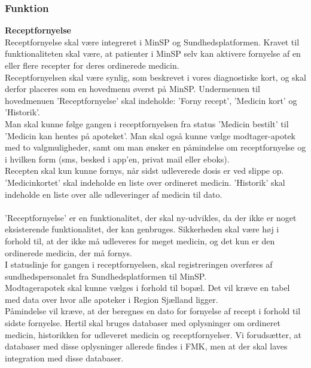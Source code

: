 \subsubsection{Funktion}
\textbf{Receptfornyelse}\\
Receptfornyelse skal være integreret i MinSP og Sundhedsplatformen. 
Kravet til funktionaliteten skal være, at patienter i MinSP selv kan aktivere fornyelse af en eller flere recepter for deres ordinerede medicin. 
\\
Receptfornyelsen skal være synlig, som beskrevet i vores diagnostiske kort, og skal derfor placeres som en hovedmenu øverst på MinSP. Undermenuen til hovedmenuen 'Receptfornyelse' skal indeholde: 'Forny recept', 'Medicin kort' og 'Historik'.
\\
Man skal kunne følge gangen i receptfornyelsen fra status 'Medicin bestilt' til 'Medicin kan hentes på apoteket'. Man skal også kunne vælge modtager-apotek med to valgmuligheder, samt om man ønsker en påmindelse om receptfornyelse og i hvilken form (sms, besked i app'en, privat mail eller eboks). 
\\ 
Recepten skal kun kunne fornys, når sidst udleverede dosis er ved slippe op.  
\\
'Medicinkortet' skal indeholde en liste over ordineret medicin.
'Historik' skal indeholde en liste over alle udleveringer af medicin til dato.
\\\\
'Receptfornyelse' er en funktionalitet, der skal ny-udvikles, da der ikke er noget eksisterende funktionalitet, der kan genbruges. Sikkerheden skal være høj i forhold til, at der ikke må udleveres for meget medicin, og det kun er den ordinerede medicin, der må fornys. \\
I statuslinje for gangen i receptfornyelsen, skal registreringen overføres af sundhedspersonalet fra Sundhedsplatformen til MinSP.\\
Modtagerapotek skal kunne vælges i forhold til bopæl. Det vil kræve en tabel med data over hvor alle apoteker i Region Sjælland ligger.\\
Påmindelse vil kræve, at der beregnes en dato for fornyelse af recept i forhold til sidste fornyelse. Hertil skal bruges databaser med oplysninger om ordineret medicin, historikken for udleveret medicin og receptfornyelser. Vi forudsætter, at databaser med disse oplysninger allerede findes i FMK, men at der skal laves integration med disse databaser. \\

